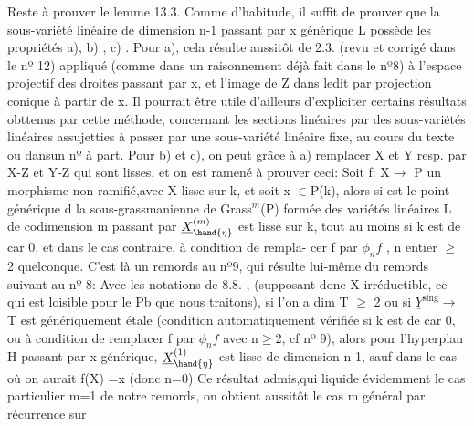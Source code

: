 
Reste à prouver le lemme 13.3.  Comme d'habitude, il suffit de prouver
que  la sous-variété linéaire de dimension n-1  passant par x générique
L\unsure{,}  possède les propriétés  a), b) , c) .  Pour  a),  cela résulte
\hand{[}aussitôt de 2.3. (revu et corrigé dans le nº 12)  appliqué (comme dans un
raisonnement déjà fait dans le nº8) à l'espace projectif  des droites
passant par x, et l'image de Z dans ledit par projection conique à
partir de x. \hand{[}Il pourrait être utile d'ailleurs d'expliciter certains
\margin{|} résultats obttenus par cette méthode, concernant les sections linéaires
par des sous-variétés linéaires assujetties à passer par une sous-variété
linéaire fixe,  au cours du texte ou dans\hand{/}un nº à part\hand{]}.  Pour  b) et c),
 on peut grâce à a)  remplacer X et Y  resp. par X-Z et Y-Z
qui sont lisses, et on est  ramené à prouver ceci:  Soit f: X$\rightarrow$ P un
morphisme non ramifié,\hand{(}avec X lisse sur k, et soit  x $\in$P(k), alors si
\hand{$\eta$} est le point générique  d  la sous-grassmanienne  de Grass$^{m}$(P)
formée des variétés linéaires L de codimension m passant par  
 \inserted{\unsure{\&}} $\underline{X}^{(m)}_{\hand{\eta}}$ est  lisse sur k, tout au
\margin{(} moins si k est de car 0, et dans le cas contraire, à condition de rempla-%
cer f par $\phi_{n}f$ , n entier $\geq$ 2 quelconque.  C'est là  un remords au nº9,
qui résulte lui-même du remords suivant au nº 8:  Avec les notations de
8.8. , (supposant donc X irréductible, ce qui est loisible pour le Pb
que nous traitons), si  l'on a dim T $\geq$ 2  ou si  $\underline{Y}^{\text{sing}}\rightarrow$ T  est
génériquement étale (condition automatiquement vérifiée si k est de car 0,
ou à condition de remplacer f par $\phi_{n}f$ avec n$\geq$2, cf nº 9), alors pour
l'hyperplan  H\hand{$_{\eta}$} passant par x  générique,  $\underline{X}^{(1)}_{\hand{\eta}}$ est lisse
de dimension n-1,  sauf dans le cas  où  on aurait  f(X) =\hand{$\{$}x\hand{$\}$}  (donc n=0)
Ce résultat admis,\hand{(}qui liquide évidemment le cas particulier m=1 de
notre remords, on obtient aussitôt le cas  m général  par récurrence sur

